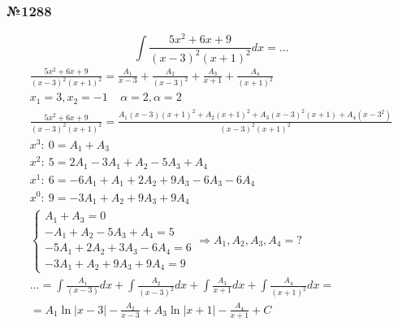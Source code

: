 \documentclass{article}
\begin{document}
\subsubsection{№1288}
\[
    \int \frac{5x^2 + 6x + 9}{(x - 3)^2(x + 1)^2} dx = \dots
\]
\begin{gather*}
    \frac{5x^2 + 6x + 9}{(x - 3)^2(x + 1)^2} = 
    \frac{A_1}{x - 3} + \frac{A_2}{(x - 3)^2} + \frac{A_3}{x + 1} + \frac{A_4}{(x + 1)^2} \\
    x_1 = 3, x_2 = -1 ~~~~~ \alpha = 2, \alpha = 2 \\
    \frac{5x^2 + 6x + 9}{(x - 3)^2 (x + 1)^2} =
    \frac{A_1(x - 3)(x + 1)^2 + A_2(x + 1)^2 + A_3(x - 3)^2(x + 1) + A_4(x - 3^2)}{(x - 3)^2(x + 1)^2} \\
    x^3:~ 0 =   A_1               +  A_3               \\
    x^2:~ 5 =  2A_1 - 3A_1 +  A_2 - 5A_3        +  A_4 \\
    x^1:~ 6 = -6A_1 +  A_1 + 2A_2 + 9A_3 - 6A_3 - 6A_4 \\
    x^0:~ 9 = -3A_1        +  A_2 + 9A_3        + 9A_4 \\
    \begin{cases}
          A_1       +  A_3         = 0 \\
         -A_1 +  A_2 - 5A_3 +  A_4 = 5 \\
        -5A_1 + 2A_2 + 3A_3 - 6A_4 = 6 \\
        -3A_1 +  A_2 + 9A_3 + 9A_4 = 9
    \end{cases} \Rightarrow A_1, A_2, A_3, A_4 = ? \\
    \dots = \int \frac{A_1}{(x - 3)} dx + \int \frac{A_2}{(x - 3)^2} dx + \int \frac{A_3}{x + 1} dx + \int \frac{A_4}{(x + 1)^2} dx = \\
    = A_1 \ln |x - 3| - \frac{A_2}{x - 3} + A_3 \ln |x + 1| - \frac{A_4}{x + 1} + C
\end{gather*}
\end{document}
